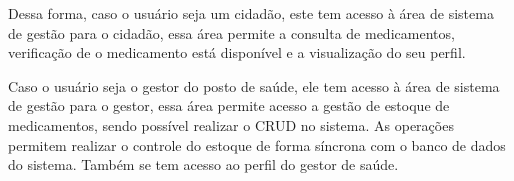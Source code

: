 Dessa forma, caso o usuário seja um cidadão, este tem acesso à área de sistema de gestão para o cidadão, essa área permite a consulta de medicamentos, verificação de o medicamento está disponível e a visualização do seu perfil. 

Caso o usuário seja o gestor do posto de saúde, ele tem acesso à área de sistema de gestão para o gestor, essa área permite acesso a gestão de estoque de medicamentos, sendo possível realizar o \acrfull{CRUD} no sistema. As operações permitem realizar o controle do estoque de forma síncrona com o banco de dados do sistema. Também se tem acesso ao perfil do gestor de saúde.


%

